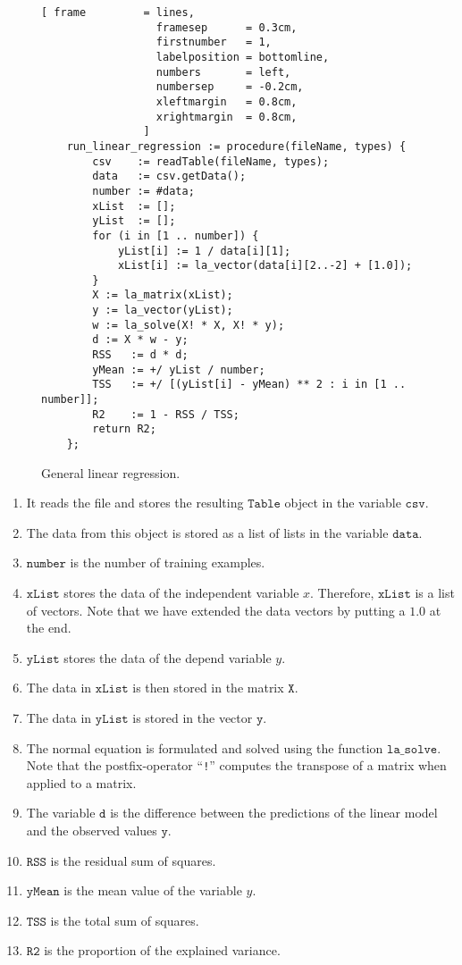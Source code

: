 \begin{figure}[!ht]
\centering
\begin{Verbatim}[ frame         = lines, 
                  framesep      = 0.3cm, 
                  firstnumber   = 1,
                  labelposition = bottomline,
                  numbers       = left,
                  numbersep     = -0.2cm,
                  xleftmargin   = 0.8cm,
                  xrightmargin  = 0.8cm,
                ]
    run_linear_regression := procedure(fileName, types) {
        csv    := readTable(fileName, types);
        data   := csv.getData();
        number := #data;
        xList  := [];
        yList  := [];
        for (i in [1 .. number]) {
            yList[i] := 1 / data[i][1];
            xList[i] := la_vector(data[i][2..-2] + [1.0]);
        }
        X := la_matrix(xList);
        y := la_vector(yList);
        w := la_solve(X! * X, X! * y);
        d := X * w - y;
        RSS   := d * d;
        yMean := +/ yList / number;
        TSS   := +/ [(yList[i] - yMean) ** 2 : i in [1 .. number]];
        R2    := 1 - RSS / TSS;
        return R2;
    };
\end{Verbatim}
\vspace*{-0.3cm}
\caption{General linear regression.}
\label{fig:linear-regression.stlx}
\end{figure}
\begin{enumerate}
\item It reads the file and stores the resulting $\mathtt{Table}$ object in the variable $\mathtt{csv}$.
\item The data from this object is stored as a list of lists in the variable $\mathtt{data}$.
\item $\mathtt{number}$ is the number of training examples.
\item $\mathtt{xList}$ stores the data of the independent variable $x$.  Therefore, $\mathtt{xList}$ is a list
      of vectors.  Note that we have extended the data vectors by putting a $1.0$ at the end.  
\item $\mathtt{yList}$ stores the data of the depend variable $y$.
\item The data in $\mathtt{xList}$ is then stored in the matrix $\mathtt{X}$.  
\item The data in $\mathtt{yList}$ is stored in the vector $\mathtt{y}$.
\item The normal equation is formulated and solved using the function $\mathtt{la\_solve}$.
      Note that the postfix-operator ``\texttt{!}'' computes the transpose of a matrix when applied to a matrix.
\item The variable $\mathtt{d}$ is the difference between the predictions of the linear model and the observed
      values $\mathtt{y}$.
\item $\mathtt{RSS}$ is the residual sum of squares.
\item $\mathtt{yMean}$ is the mean value of the variable $y$.
\item $\mathtt{TSS}$ is the total sum of squares.
\item $\mathtt{R2}$ is the proportion of the explained variance.
\end{enumerate}



